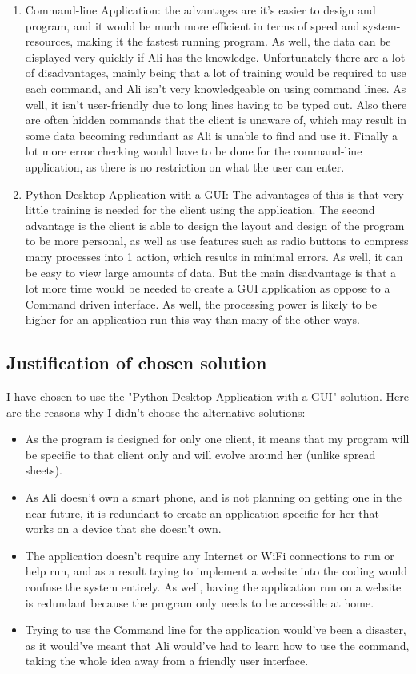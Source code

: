 \begin{enumerate}
\item Command-line Application: the advantages are it's easier to design and program, and it would be much more efficient in terms of speed and system-resources, making it the fastest running program. As well, the data can be displayed very quickly if Ali has the knowledge. Unfortunately there are a lot of disadvantages, mainly being that a lot of training would be required to use each command, and Ali isn't very knowledgeable on using command lines. As well, it isn't user-friendly due to long lines having to be typed out. Also there are often hidden commands that the client is unaware of, which may result in some data becoming redundant as Ali is unable to find and use it.  Finally a lot more error checking would have to be done for the command-line application, as there is no restriction on what the user can enter.

\item Python Desktop Application with a GUI: The advantages of this is that very little training is needed for the client using the application. The second advantage is the client is able to design the layout and design of the program to be more personal, as well as use features such as radio buttons to compress many processes into 1 action, which results in minimal errors. As well, it can be easy to view large amounts of data. But the main disadvantage is that a lot more time would be needed to create a GUI application as oppose to a Command driven interface. As well, the processing power is likely to be higher for an application run this way than many of the other ways.
\end{enumerate}

\subsection{Justification of chosen solution}
I have chosen to use the "Python Desktop Application with a GUI" solution.
Here are the reasons why I didn't choose the alternative solutions:

\begin{itemize}
\item As the program is designed for only one client,  it means that my program will be specific to that client only and will evolve around her (unlike spread sheets).
\item As Ali doesn't own a smart phone, and is not planning on getting one in the near future, it is redundant to create an application specific for her that works on a device that she doesn't own.
\item The application doesn't require any Internet or WiFi connections to run or help run, and as a result trying to implement a website into the coding would confuse the system entirely. As well, having the application run on a website is redundant because the program only needs to be accessible at home.
\item Trying to use the Command line for the application would've been a disaster, as it would've meant that Ali would've had to learn how to use the command, taking the whole idea away from a friendly user interface.
\end{itemize}

